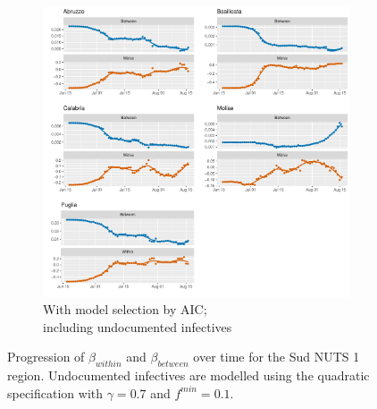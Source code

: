 \documentclass[12pt]{article}
\begin{document}
\begin{appendices}
\begin{figure}[H]
\begin{subfigure}{\textwidth}
    	      \includegraphics[width=\linewidth]{output/model_between_lag14_betas_Sud_aic_UndocQuadratic_rolling.pdf}
    	      \caption{With model selection by AIC; \\ including undocumented infectives}
    	      \label{fig:beta_between_over_time_sud_aic_undoc}
    	    \end{subfigure}
    	    \caption{Progression of $\beta_{within}$ and $\beta_{between}$ over time for the Sud NUTS 1 region. Undocumented infectives are modelled using the quadratic specification with $\gamma = 0.7$ and $f^{min}=0.1$.}
    	    \label{fig:beta_between_over_time_sud}
        \end{figure}
		

\end{appendices}
\end{document}
